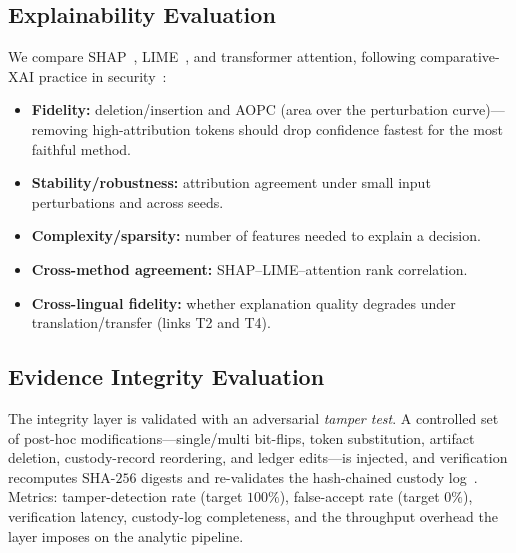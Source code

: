 \documentclass[11pt,a4paper]{article}
\begin{document}
\subsection{Explainability Evaluation}\label{sec:method-xai}
We compare SHAP~\cite{lundberg2017shap}, LIME~\cite{ribeiro2016lime}, and transformer
attention, following comparative-XAI practice in
security~\cite{hermosilla2025xai,gaspar2024xai,kalakoti2025evaluating,salih2023perspective}:
\begin{itemize}[leftmargin=1.5em,itemsep=1pt]
  \item \textbf{Fidelity:} deletion/insertion and AOPC (area over the perturbation
  curve)---removing high-attribution tokens should drop confidence fastest for the most
  faithful method.
  \item \textbf{Stability/robustness:} attribution agreement under small input
  perturbations and across seeds.
  \item \textbf{Complexity/sparsity:} number of features needed to explain a decision.
  \item \textbf{Cross-method agreement:} SHAP--LIME--attention rank correlation.
  \item \textbf{Cross-lingual fidelity:} whether explanation quality degrades under
  translation/transfer (links T2 and T4).
\end{itemize}

\subsection{Evidence Integrity Evaluation}\label{sec:method-integrity}
The integrity layer is validated with an adversarial \emph{tamper test}. A controlled
set of post-hoc modifications---single/multi bit-flips, token substitution, artifact
deletion, custody-record reordering, and ledger edits---is injected, and verification
recomputes $\text{SHA-256}$ digests and re-validates the hash-chained custody
log~\cite{lone2019forensicchain,ali2022procedure,loffi2025management}. Metrics:
tamper-detection rate (target $100\%$), false-accept rate (target $0\%$), verification
latency, custody-log completeness, and the throughput overhead the layer imposes on the
analytic pipeline.

\end{document}
